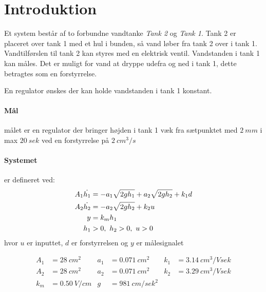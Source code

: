 \section{Introduktion}
Et system består af to forbundne vandtanke \emph{Tank 2} og \emph{Tank 1}. Tank
2 er placeret over tank 1 med et hul i bunden, så vand løber fra tank 2 over i
tank 1. Vandtilførslen til tank 2 kan styres med en elektrisk ventil.
Vandstanden i tank 1 kan måles.
Det er muligt for vand at dryppe udefra og ned i tank 1, dette betragtes som en
forstyrrelse.

En regulator ønskes der kan holde vandstanden i tank 1 konstant.

\paragraph*{Mål}
målet er en regulator der bringer højden i tank 1 væk fra sætpunktet
med $2~mm$ i max $20~sek$ ved en forstyrrelse på $2~cm^3/s$

\paragraph*{Systemet}
er defineret ved:
\begin{align*}
A_1 \dot{h_1} &= -a_1\sqrt{2gh_1} + a_2\sqrt{2gh_2} + k_1d\\
A_2 \dot{h_2} &= -a_2\sqrt{2gh_2} + k_2u\\
y &= k_mh_1\\
h_1 &> 0,~h_2 > 0,~u>0
\end{align*}
hvor $u$ er inputtet, $d$ er forstyrrelsen og $y$ er målesignalet

\begin{align*}
A_1 &= 28~cm^2 & a_1 &= 0.071~cm^2 & k_1 &= 3.14~cm^3/V sek\\
A_2 &= 28~cm^2 & a_2 &= 0.071~cm^2 & k_2 &= 3.29~cm^3/V sek\\
k_m &= 0.50~V/cm & g &= 981~cm/sek^2
\end{align*}